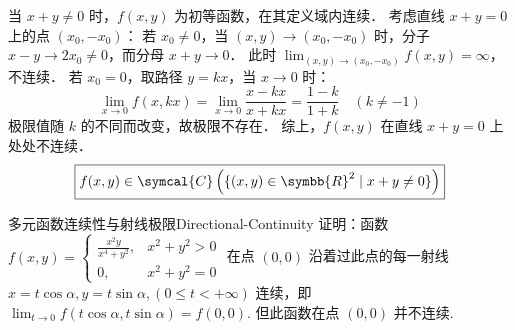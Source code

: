 \begin{solution}

    当 $x + y \neq 0$ 时，$f(x, y)$ 为初等函数，在其定义域内连续．
    考虑直线 $x + y = 0$ 上的点 $(x_0, -x_0)$：
    若 $x_0 \neq 0$，当 $(x, y) \to (x_0, -x_0)$ 时，分子 $x - y \to 2x_0 \neq 0$，而分母 $x + y \to 0$．
    此时 $\lim_{(x, y) \to (x_0, -x_0)} f(x, y) = \infty$，不连续．
    若 $x_0 = 0$，取路径 $y = kx$，当 $x \to 0$ 时：
    \begin{equation}
        \lim_{x \to 0} f(x, kx) = \lim_{x \to 0} \frac{x - kx}{x + kx} = \frac{1 - k}{1 + k} \quad (k \neq -1)
    \end{equation}
    极限值随 $k$ 的不同而改变，故极限不存在．
    综上，$f(x, y)$ 在直线 $x + y = 0$ 上处处不连续．
    \begin{equation}
        \boxed{f(x, y) \in \symcal{C}\left( \{(x, y) \in \symbb{R}^2 \mid x + y \neq 0\} \right)}
    \end{equation}
\end{solution}


\begin{problem}{多元函数连续性与射线极限}{Directional-Continuity}
    证明：函数 $f(x, y) = \begin{cases} \frac{x^2y}{x^4+y^2}, & x^2+y^2 > 0 \\ 0, & x^2+y^2 = 0 \end{cases}$ 在点 $(0,0)$ 沿着过此点的每一射线 $x = t \cos \alpha, y = t \sin \alpha, (0 \le t < +\infty)$ 连续，即 $\lim_{t \to 0} f(t \cos \alpha, t \sin \alpha) = f(0,0)$. 但此函数在点 $(0,0)$ 并不连续.
\end{problem}

